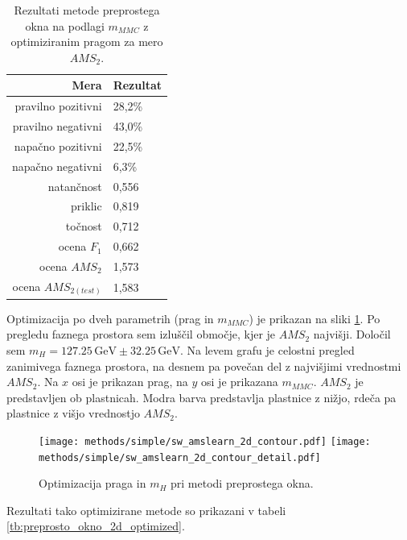 \documentclass[11pt,a4paper,openany]{book}
\begin{document}
\begin{table}[ht]
	\centering
	\begin{tabular}{rl}
		\hline
		\textbf{Mera} & \textbf{Rezultat} \\
		\hline
		pravilno pozitivni & 28,2\%\\
		pravilno negativni & 43,0\% \\
		napačno pozitivni & 22,5\% \\
		napačno negativni & 6,3\% \\
		natančnost & 0,556 \\
		priklic & 0,819 \\
		točnost & 0,712 \\
		ocena $F_1$ & 0,662 \\
		ocena $AMS_2$ & 1,573 \\
		ocena $AMS_{2(test)}$ & 1,583 		
	\end{tabular}
	\caption{Rezultati metode preprostega okna na podlagi $m_{MMC}$ z optimiziranim pragom za mero $AMS_2$.}
	\label{tb:preprosto_okno_optimized}
\end{table}

Optimizacija po dveh parametrih (prag in $m_{MMC}$) je prikazan na sliki \ref{sl:simple_optimization_2d}. Po pregledu faznega prostora sem izluščil območje, kjer je $AMS_2$ najvišji. Določil sem $m_H = \num{127,25}\,\text{GeV} \pm \num{32,25}\,\text{GeV}$. Na levem grafu je celostni pregled zanimivega faznega prostora, na desnem pa povečan del z najvišjimi vrednostmi $AMS_2$. Na $x$ osi je prikazan prag, na $y$ osi je prikazana $m_{MMC}$. $AMS_2$ je predstavljen ob plastnicah. Modra barva predstavlja plastnice z nižjo, rdeča pa plastnice z višjo vrednostjo $AMS_2$.

\begin{figure}[h]
	\centering	
	\texttt{[image: methods/simple/sw\_amslearn\_2d\_contour.pdf]}
	\texttt{[image: methods/simple/sw\_amslearn\_2d\_contour\_detail.pdf]}		
	
	\caption{Optimizacija praga in $m_H$ pri metodi preprostega okna.}
	\label{sl:simple_optimization_2d}
\end{figure}

Rezultati tako optimizirane metode so prikazani v tabeli \ref{tb:preprosto_okno_2d_optimized}.
\end{document}
